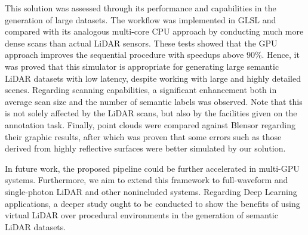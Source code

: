 This solution was assessed through its performance and capabilities in the generation of large datasets. The workflow was implemented in GLSL and compared with its analogous multi-core CPU approach by conducting much more dense scans than actual LiDAR sensors. These tests showed that the GPU approach improves the sequential procedure with speedups above 90\%. Hence, it was proved that this simulator is appropriate for generating large semantic LiDAR datasets with low latency, despite working with large and highly detailed scenes. Regarding scanning capabilities, a significant enhancement both in average scan size and the number of semantic labels was observed. Note that this is not solely affected by the LiDAR scans, but also by the facilities given on the annotation task. Finally, point clouds were compared against Blensor regarding their graphic results, after which was proven that some errors such as those derived from highly reflective surfaces were better simulated by our solution. 

In future work, the proposed pipeline could be further accelerated in multi-GPU systems. Furthermore, we aim to extend this framework to full-waveform and single-photon LiDAR \cite{tachella_real-time_2019} and other nonincluded systems. Regarding Deep Learning applications, a deeper study ought to be conducted to show the benefits of using virtual LiDAR over procedural environments in the generation of semantic LiDAR datasets.

\newcommand{\datasetImageHeight}{-.09\totalheight}
\newcommand{\datasetImageSize}{1.8cm}
\newcommand{\lidarCoreLabel}{ToF Solver}

